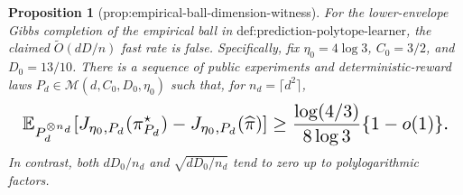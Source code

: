 \documentclass{article}
\newtheorem{proposition}{Proposition}
\begin{document}
\begin{proposition}[prop:empirical-ball-dimension-witness]\label{prop:empirical-ball-dimension-witness}
For the lower-envelope Gibbs completion of the empirical ball in \(\text{def:prediction-polytope-learner}\), the claimed \(\widetilde O(dD/n)\) fast rate is false. Specifically, fix \(\eta_0=4\log3\), \(C_0=3/2\), and \(D_0=13/10\). There is a sequence of public experiments and deterministic-reward laws \(P_d\in\mathcal M(d,C_0,D_0,\eta_0)\) such that, for \(n_d=\lceil d^2\rceil\),
\[
\makebox[\linewidth][c]{\resizebox{0.98\linewidth}{!}{\(\displaystyle \mathbb E_{P_d^{\otimes n_d}}[J_{\eta_0,P_d}(\pi_{P_d}^\star)-J_{\eta_0,P_d}(\widehat\pi)]
\ge \frac{\log(4/3)}{8\log3}\{1-o(1)\}.\)}}
\]
In contrast, both \(dD_0/n_d\) and \(\sqrt{dD_0/n_d}\) tend to zero up to polylogarithmic factors.
\end{proposition}
\end{document}

